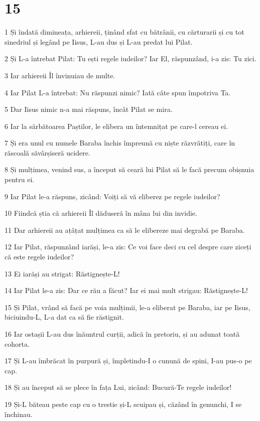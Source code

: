 \chapter{15}

\par 1 Și îndată dimineața, arhiereii, ținând sfat cu bătrânii, cu cărturarii și cu tot sinedriul și legând pe Iisus, L-au dus și L-au predat lui Pilat.
\par 2 Și L-a întrebat Pilat: Tu ești regele iudeilor? Iar El, răspunzând, i-a zis: Tu zici.
\par 3 Iar arhiereii Îl învinuiau de multe.
\par 4 Iar Pilat L-a întrebat: Nu răspunzi nimic? Iată câte spun împotriva Ta.
\par 5 Dar Iisus nimic n-a mai răspuns, încât Pilat se mira.
\par 6 Iar la sărbătoarea Paștilor, le elibera un întemnițat pe care-l cereau ei.
\par 7 Și era unul cu numele Baraba închis împreună cu niște răzvrătiți, care în răscoală săvârșiseră ucidere.
\par 8 Și mulțimea, venind sus, a început să ceară lui Pilat să le facă precum obișnuia pentru ei.
\par 9 Iar Pilat le-a răspuns, zicând: Voiți să vă eliberez pe regele iudeilor?
\par 10 Fiindcă știa că arhiereii Îl dăduseră în mâna lui din invidie.
\par 11 Dar arhiereii au ațâțat mulțimea ca să le elibereze mai degrabă pe Baraba.
\par 12 Iar Pilat, răspunzând iarăși, le-a zis: Ce voi face deci cu cel despre care ziceți că este regele iudeilor?
\par 13 Ei iarăși au strigat: Răstignește-L!
\par 14 Iar Pilat le-a zis: Dar ce rău a făcut? Iar ei mai mult strigau: Răstignește-L!
\par 15 Și Pilat, vrând să facă pe voia mulțimii, le-a eliberat pe Baraba, iar pe Iisus, biciuindu-L, L-a dat ca să fie răstignit.
\par 16 Iar ostașii L-au dus înăuntrul curții, adică în pretoriu, și au adunat toată cohorta.
\par 17 Și L-au îmbrăcat în purpură și, împletindu-I o cunună de spini, I-au pus-o pe cap.
\par 18 Și au început să se plece în fața Lui, zicând: Bucură-Te regele iudeilor!
\par 19 Și-L băteau peste cap cu o trestie și-L scuipau și, căzând în genunchi, I se închinau.

